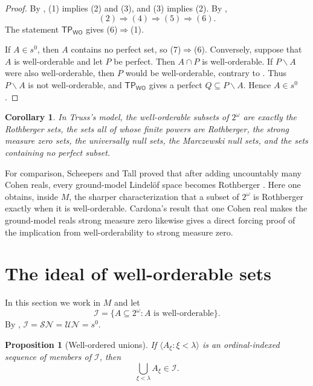 \documentclass[11pt,reqno]{amsart}
\newcommand{\WO}{\mathsf{WO}}
\newcommand{\SN}{\mathcal{SN}}
\newcommand{\UN}{\mathcal{UN}}
\newcommand{\Mar}{s^0}
\newcommand{\TP}{\mathsf{TP}_{\WO}}
\theoremstyle{plain}
\newtheorem{proposition}[proposition]{Proposition}
\newtheorem{corollary}[corollary]{Corollary}
\theoremstyle{definition}
\theoremstyle{remark}
\begin{document}
\begin{proof}
By , (1) implies (2) and (3), and (3) implies (2).
By ,
\[
 (2)\Longrightarrow(4)\Longrightarrow(5)\Longrightarrow(6).
\]
The statement $\TP$ gives (6)$\Rightarrow$(1).

If $A\in\Mar$, then $A$ contains no perfect set, so (7)$\Rightarrow$(6).
Conversely, suppose that $A$ is well-orderable and let $P$ be perfect.  Then
$A\cap P$ is well-orderable.  If $P\smallsetminus A$ were also well-orderable,
then $P$ would be well-orderable, contrary to .
Thus $P\smallsetminus A$ is not well-orderable, and $\TP$ gives a perfect
$Q\subseteq P\smallsetminus A$.  Hence $A\in\Mar$.
\end{proof}

\begin{corollary}\label{cor:smallness-model}
In Truss's model, the well-orderable subsets of $2^\omega$ are exactly the
Rothberger sets, the sets all of whose finite powers are Rothberger, the
strong measure zero sets, the universally null sets, the Marczewski null
sets, and the sets containing no perfect subset.
\end{corollary}

For comparison, Scheepers and Tall proved that after adding uncountably many Cohen reals, every ground-model Lindel\"of space becomes Rothberger \cite{ScheepersTall2010}.
Here one obtains, inside $M$, the sharper characterization that a subset of $2^\omega$ is Rothberger exactly when it is well-orderable.
Cardona's result that one Cohen real makes the ground-model reals strong measure zero \cite{Cardona2020} likewise gives a direct forcing proof of the implication from well-orderability to strong measure zero.

\section{The ideal of well-orderable sets}\label{sec:ideal}

In this section we work in $M$ and let
\[
 \mathcal I=\{A\subseteq2^\omega:A\text{ is well-orderable}\}.
\]
By , $\mathcal I=\SN=\UN=\Mar$.

\begin{proposition}[Well-ordered unions]\label{prop:wellordered-unions}
If $\langle A_\xi:\xi<\lambda\rangle$ is an ordinal-indexed sequence of
members of $\mathcal I$, then
\[
 \bigcup_{\xi<\lambda}A_\xi\in\mathcal I.
\]
\end{proposition}
\end{document}
